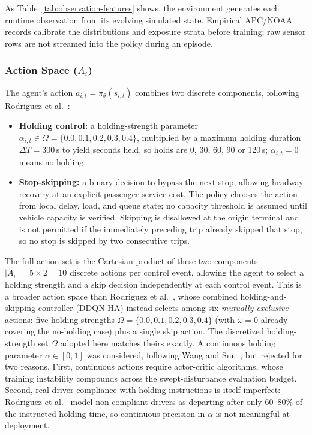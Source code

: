 As Table~\ref{tab:observation-features} shows, the environment generates each runtime observation from its evolving simulated state. Empirical APC/NOAA records calibrate the distributions and exposure strata before training; raw sensor rows are not streamed into the policy during an episode.

\subsubsection{Action Space ($A_i$)}
\label{subsec:action-space}

The agent's action $a_{i,t} = \pi_\theta(s_{i,t})$ combines two discrete components, following Rodriguez et al.~\cite{Rodriguez2023Cooperative}:

\begin{itemize}
\item \textbf{Holding control:} a holding-strength parameter $\alpha_{i,t} \in \Omega = \{0.0, 0.1, 0.2, 0.3, 0.4\}$, multiplied by a maximum holding duration $\Delta T = 300$\,s to yield seconds held, so holds are 0, 30, 60, 90 or 120\,s; $\alpha_{i,t} = 0$ means no holding.
\item \textbf{Stop-skipping:} a binary decision to bypass the next stop, allowing headway recovery at an explicit passenger-service cost. The policy chooses the action from local delay, load, and queue state; no capacity threshold is assumed until vehicle capacity is verified. Skipping is disallowed at the origin terminal and is not permitted if the immediately preceding trip already skipped that stop, so no stop is skipped by two consecutive trips.
\end{itemize}

The full action set is the Cartesian product of these two components: $|A_i| = 5 \times 2 = 10$ discrete actions per control event, allowing the agent to select a holding strength and a skip decision independently at each control event. This is a broader action space than Rodriguez et al.~\cite{Rodriguez2023Cooperative}, whose combined holding-and-skipping controller (DDQN-HA) instead selects among six \textit{mutually exclusive} actions: five holding strengths $\Omega = \{0.0, 0.1, 0.2, 0.3, 0.4\}$ (with $\omega = 0$ already covering the no-holding case) plus a single skip action. The discretized holding-strength set $\Omega$ adopted here matches theirs exactly. A continuous holding parameter $\alpha \in [0, 1]$ was considered, following Wang and Sun~\cite{Wangsun}, but rejected for two reasons. First, continuous actions require actor-critic algorithms, whose training instability compounds across the swept-disturbance evaluation budget. Second, real driver compliance with holding instructions is itself imperfect: Rodriguez et al.~\cite{Rodriguez2023Cooperative} model non-compliant drivers as departing after only 60--80\% of the instructed holding time, so continuous precision in $\alpha$ is not meaningful at deployment.

